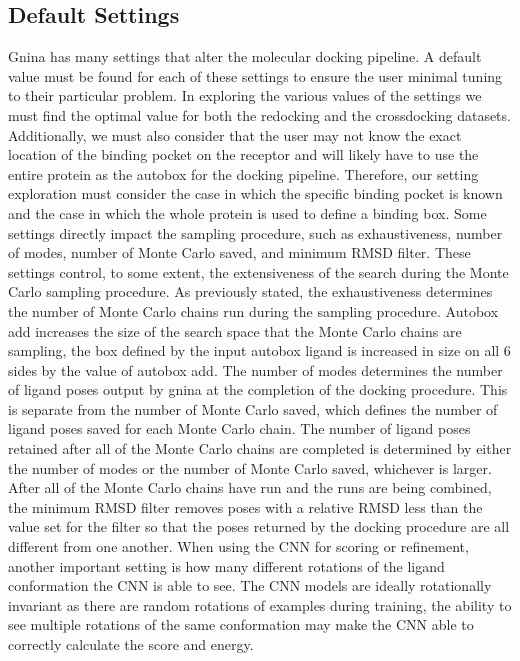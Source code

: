 \documentclass[journal=jcisd8,manuscript=article]{achemso}
\begin{document}
\subsection{Default Settings}
Gnina has many settings that alter the molecular docking pipeline. A default value must be found for each of these settings to ensure the user minimal tuning to their particular problem. In exploring the various values of the settings we must find the optimal value for both the redocking and the crossdocking datasets. Additionally, we must also consider that the user may not know the exact location of the binding pocket on the receptor and will likely have to use the entire protein as the autobox for the docking pipeline. Therefore, our setting exploration must consider the case in which the specific binding pocket is known and the case in which the whole protein is used to define a binding box. Some settings directly impact the sampling procedure, such as exhaustiveness, number of modes, number of Monte Carlo saved, and minimum RMSD filter. These settings control, to some extent, the extensiveness of the search during the Monte Carlo sampling procedure. As previously stated, the exhaustiveness determines the number of Monte Carlo chains run during the sampling procedure. Autobox add increases the size of the search space that the Monte Carlo chains are sampling, the box defined by the input autobox ligand is increased in size on all 6 sides by the value of autobox add. The number of modes determines the number of ligand poses output by gnina at the completion of the docking procedure. This is separate from the number of Monte Carlo saved, which defines the number of  ligand poses saved for each Monte Carlo chain. The number of ligand poses retained after all of the Monte Carlo chains are completed is determined by either the number of modes or the number of Monte Carlo saved, whichever is larger. After all of the Monte Carlo chains have run and the runs are being combined, the minimum RMSD filter removes poses with a relative RMSD less than the value set for the filter so that the poses returned by the docking procedure are all different from one another. When using the CNN for scoring or refinement, another important setting is how many different rotations of the ligand conformation the CNN is able to see. The CNN models are ideally rotationally invariant as there are random rotations of examples during training, the ability to see multiple rotations of the same conformation may make the CNN able to correctly calculate the score and energy.
\end{document}
